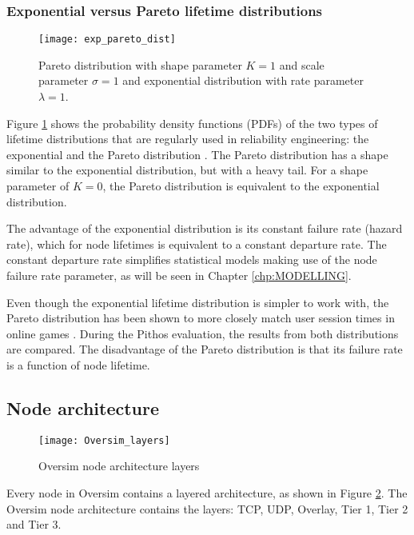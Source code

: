 \subsubsection{Exponential versus Pareto lifetime distributions}

\begin{figure}[htbp]
 \centering
 \texttt{[image: exp\_pareto\_dist]}
 \caption{Pareto distribution with shape parameter $K=1$ and scale parameter $\sigma=1$ and exponential distribution with rate parameter $\lambda=1$.}
 \label{fig_exp_pareto_dists}
\end{figure}
%
Figure \ref{fig_exp_pareto_dists} shows the probability density functions (PDFs) of the two types of lifetime distributions that are regularly used in reliability engineering: the exponential and the Pareto distribution \cite{rausand2004systemreliability}. The Pareto distribution has a shape similar to the exponential distribution, but with a heavy tail. For a shape parameter of $K=0$, the Pareto distribution is equivalent to the exponential distribution.

The advantage of the exponential distribution is its constant failure rate (hazard rate), which for node lifetimes is equivalent to a constant departure rate. The constant departure rate simplifies statistical models making use of the node failure rate parameter, as will be seen in Chapter \ref{chp:MODELLING}.

Even though the exponential lifetime distribution is simpler to work with, the Pareto distribution has been shown to more closely match user session times in online games \cite{Kwok_dist_match}. During the Pithos evaluation, the results from both distributions are compared. The disadvantage of the Pareto distribution is that its failure rate is a function of node lifetime.

\subsection{Node architecture}

\begin{figure}[htbp]
 \centering
 \texttt{[image: Oversim\_layers]}
 \caption{Oversim node architecture layers}
 \label{fig_oversim_layers}
\end{figure}


Every node in Oversim contains a layered architecture, as shown in Figure \ref{fig_oversim_layers}. The Oversim node architecture contains the layers: TCP, UDP, Overlay, Tier 1, Tier 2 and Tier 3.

